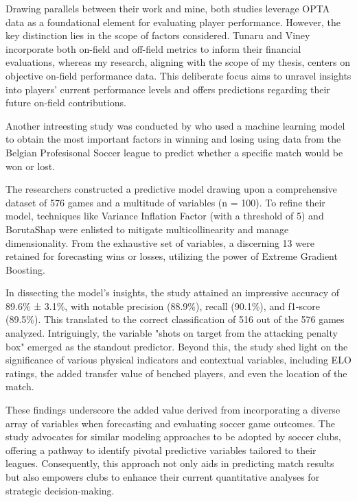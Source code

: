 \documentclass[12pt]{article}
\begin{document}
Drawing parallels between their work and mine, both studies leverage OPTA data
as a foundational element for evaluating player performance. However, the key
distinction lies in the scope of factors considered. Tunaru and Viney incorporate
both on-field and off-field metrics to inform their financial evaluations,
whereas my research, aligning with the scope of my thesis, centers on objective
on-field performance data. This deliberate focus aims to unravel insights into
players' current performance levels and offers predictions regarding their future
on-field contributions.


Another intreesting study was conducted by \citet{geurkink2021machine} who used
a machine learning model to obtain the most important factors in winning and
losing using data from the Belgian Profesisonal Soccer league to 
predict whether a specific match would be won or lost.

The researchers constructed a predictive
model drawing upon a comprehensive dataset of 576 games and a multitude of
variables (n = 100). To refine their model, techniques like Variance Inflation
Factor (with a threshold of 5) and BorutaShap were enlisted to mitigate
multicollinearity and manage dimensionality. From the exhaustive set of variables,
a discerning 13 were retained for forecasting wins or losses, utilizing the power of
Extreme Gradient Boosting.

In dissecting the model's insights, the study attained an impressive accuracy of
89.6\% ± 3.1\%, with notable precision (88.9\%), recall (90.1\%), and f1-score
(89.5\%). This translated to the correct classification of 516 out of the 576
games analyzed. Intriguingly, the variable "shots on target from the attacking
penalty box" emerged as the standout predictor. Beyond this, the study shed
light on the significance of various physical indicators and contextual
variables, including ELO ratings, the added transfer value of benched players,
and even the location of the match.

These findings underscore the added value derived from incorporating a diverse
array of variables when forecasting and evaluating soccer game outcomes. The
study advocates for similar modeling approaches to be adopted by soccer clubs,
offering a pathway to identify pivotal predictive variables tailored to their
leagues. Consequently, this approach not only aids in predicting match results
but also empowers clubs to enhance their current quantitative analyses for
strategic decision-making.
\end{document}
